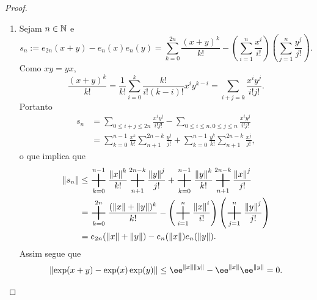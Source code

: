 \begin{proof}
\begin{enumerate}
	\item Sejam $n \in \mathbb{N}$ e
		\begin{equation*}
		s_n := e_{2n}(x+y) - e_n(x)e_n(y) = \sum_{k=0}^{2n} \frac{(x+y)^k}{k!} - \left( \sum_{i=1}^n \frac{x^i}{i!} \right)\left( \sum_{j=1}^n \frac{y^j}{j!} \right).
		\end{equation*}
Como $xy=yx$,
	\begin{equation*}
	\frac{(x+y)^k}{k!} = \frac{1}{k!} \sum_{i=0}^k \frac{k!}{i!(k-i)!}x^i y^{k-i} = \sum_{i+j=k} \frac{x^i y^j}{i!j!}.
	\end{equation*}
Portanto
	\begin{align*}
	s_n &= \sum_{0 \leq i+j \leq 2n} \frac{x^i y^j}{i!j!} - \sum_{0 \leq i \leq n, 0 \leq j \leq n} \frac{x^i y^j}{i!j!} \\
		&= \sum_{k=0}^{n-1} \frac{x^k}{k!} \sum_{n+1}^{2n-k} \frac{y^j}{j!} +  \sum_{k=0}^{n-1} \frac{y^k}{k!} \sum_{n+1}^{2n-k} \frac{x^j}{j!},
	\end{align*}
o que implica que
	\begin{align*}
	\nor{s_n} &\leq \sum_{k=0}^{n-1} \frac{\nor{x}^k}{k!} \sum_{n+1}^{2n-k} \frac{\nor{y}^j}{j!} +  \sum_{k=0}^{n-1} \frac{\nor{y}^k}{k!} \sum_{n+1}^{2n-k} \frac{\nor{x}^j}{j!} \\
		&= \sum_{k=0}^{2n} \frac{(\nor{x}+\nor{y})^k}{k!} - \left( \sum_{i=1}^n \frac{\nor{x}^i}{i!} \right)\left( \sum_{j=1}^n \frac{\nor{y}^j}{j!} \right) \\
		&= e_{2n}(\nor{x}+\nor{y}) - e_n(\nor{x})e_n(\nor{y}).
	\end{align*}
Assim segue que
	\begin{equation*}
	\nor{\exp(x+y) - \exp(x)\exp(y)} \leq \ee^{\nor{x}\nor{y}}-\ee^{\nor{x}}\ee^{\nor{y}} = 0.
	\end{equation*}
	

	

\end{enumerate}
\end{proof}
